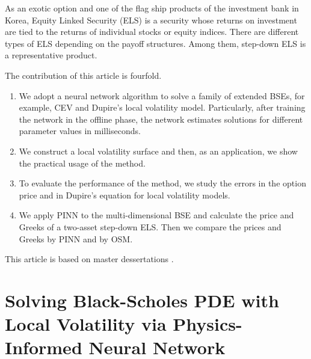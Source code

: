 \documentclass[11pt,reqno]{article}
\numberwithin{equation}{section}
\begin{document}
 As an exotic option and one of the flag ship products of the investment bank in Korea, Equity Linked Security (ELS) is a security whose returns on investment are tied to the returns of individual stocks or equity indices. There are different types of ELS depending on the payoff structures. Among them, step-down ELS is a representative product.
%

The contribution of this article is fourfold.
\begin{enumerate}\vspace{-2mm}
	\item
We adopt a neural network algorithm to solve a family of extended BSEs, for example, CEV and Dupire’s local volatility model. Particularly, after training the network in the offline phase, the network estimates solutions for different parameter values in milliseconds.
	\item \vspace{-2mm}
We construct a local volatility surface and then, as an application, we show the practical usage of the method.
	\item \vspace{-2mm}
To evaluate the performance of the method, we study the errors in the option price and in Dupire’s equation for local volatility models.
	\item\vspace{-2mm}
We apply PINN to the multi-dimensional BSE and calculate the price and Greeks of a two-asset step-down ELS.
 Then we compare the  prices and Greeks by PINN and by OSM.
\end{enumerate}
%
This article is based on master dessertations \cite{kang2023, muhyun2022}.


\section{Solving Black-Scholes PDE with Local Volatility via Physics-Informed Neural Network}
\label{sec:headings}
\end{document}

